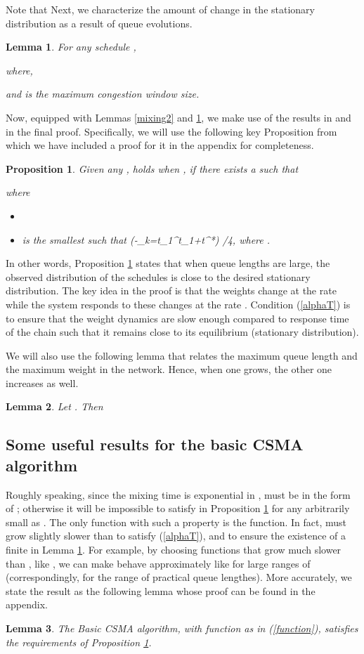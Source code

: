 \documentclass[10pt,onecolumn,draftclsnofoot,journal]{IEEEtran}
\newtheorem{lemma}{Lemma}
\newtheorem{proposition}{Proposition}
\newcommand{\be}{}
\begin{document}
Note that 
Next, we characterize the amount of change in the stationary distribution as a result of queue evolutions.
\begin{lemma} \label{alpha ratio}
For any schedule ,

where,

and  is the maximum congestion window size.
\end{lemma}
Now, equipped with Lemmas \ref{mixing2} and \ref{alpha ratio}, we make use of the results in \cite{shah, shah2} and \cite{ghaderi} in the final proof. Specifically, we will use the following key Proposition from \cite{ghaderi} which we have included a proof for it in the appendix for completeness.
\begin{proposition}\label{drift}
Given any ,  holds when , if there exists a  such that

where
\begin{itemize}
\item[(i)] 
\item [(ii)]  is the smallest  such that
\be\label{t*}
 \exp(-\sum_{k=t_1}^{t_1+t^*}) \leq \delta/4,
\ee
where .
\end{itemize}
\end{proposition}
In other words, Proposition \ref{drift} states that when queue lengths are large, the observed distribution of the schedules is close to the desired stationary distribution. The key idea in the proof is that the weights change at the rate  while the system responds to these changes at the rate . Condition (\ref{alphaT}) is to ensure that the weight dynamics are slow enough compared to response time of the chain such that it remains close to its equilibrium (stationary distribution).


We will also use the following lemma that relates the maximum queue length and the maximum weight in the network. Hence, when one grows, the other one increases as well.
\begin{lemma} \label{relate}
Let . Then

\end{lemma}
\subsection*{Some useful results for the basic CSMA algorithm}
Roughly speaking, since the mixing time  is exponential in ,  must be in the form of ;
otherwise it will be impossible to satisfy  in Proposition \ref{drift} for any arbitrarily small  as .
The only function with such a property is the  function. In fact,  must grow slightly slower than  to satisfy (\ref{alphaT}), and to ensure the existence of a finite  in Lemma \ref{drift}. For example, by choosing functions that grow much slower than , like , we can make  behave approximately like  for large ranges of  (correspondingly, for the range of practical queue lengthes). More accurately, we state the result as the following lemma whose proof can be found in the appendix.
\begin{lemma}\label{lemma: adiabatic}
The Basic CSMA algorithm, with function  as in (\ref{function}), satisfies the requirements of Proposition \ref{drift}.
\end{lemma}
\end{document}
